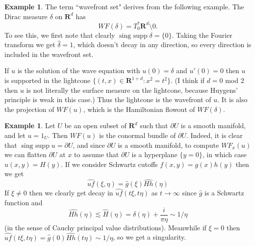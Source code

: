 \documentclass[reqno,12pt,letterpaper]{amsart}
\newcommand{\RR}{\mathbf{R}}
\DeclareMathOperator{\singsupp}{sing~supp}
\theoremstyle{definition}
\newtheorem{example}[theorem]{Example}
\begin{document}
\begin{example}
The term ``wavefront set" derives from the following example.
The Dirac measure $\delta$ on $\RR^d$ has
$$WF(\delta) = T_0^*\RR^d \setminus 0.$$
To see this, we first note that clearly $\singsupp \delta = \{0\}$.
Taking the Fourier transform we get $\hat \delta = 1$, which doesn't decay in any direction, so every direction is included in the wavefront set.

If $u$ is the solution of the wave equation with $u(0) = \delta$ and $u'(0) = 0$ then $u$ is supported in the lightcone $\{(t, x) \in \RR^{1 + d}: x^2 = t^2\}$. (I think if $d = 0$ mod $2$ then $u$ is not literally the surface measure on the lightcone, because Huygens' principle is weak in this case.)
Thus the lightcone is the wavefront of $u$. It is also the projection of $WF(u)$, which is the Hamiltonian flowout of $WF(\delta)$.
\end{example}

\begin{example}
Let $U$ be an open subset of $\RR^d$ such that $\partial U$ is a smooth manifold, and let $u = 1_U$.
Then $WF(u)$ is the conormal bundle of $\partial U$.
Indeed, it is clear that $\singsupp u = \partial U$, and since $\partial U$ is a smooth manifold, to compute $WF_x(u)$ we can flatten $\partial U$ at $x$ to assume that $\partial U$ is a hyperplane $\{y = 0\}$, in which case $u(x, y) = H(y)$.
If we consider Schwartz cutoffs $f(x, y) = g(x)h(y)$ then we get
$$\widehat{uf}(\xi, \eta) = \hat g(\xi) \widehat{Hh}(\eta)$$
If $\xi \neq 0$ then we clearly get decay in $\widehat{uf}(t\xi, t\eta)$ as $t \to \infty$ since $\hat g$ is a Schwartz function and
$$\widehat{Hh}(\eta) \lesssim \widehat H(\eta) = \delta(\eta) + \frac{i}{\pi\eta} \sim 1/\eta$$
(in the sense of Cauchy principal value distributions).
Meanwhile if $\xi = 0$ then $\widehat{uf}(t\xi, t\eta) = \hat g(0) \widehat{Hh}(t\eta) \sim 1/\eta$, so we get a singularity.
\end{example}




















\printbibliography
\end{document}

